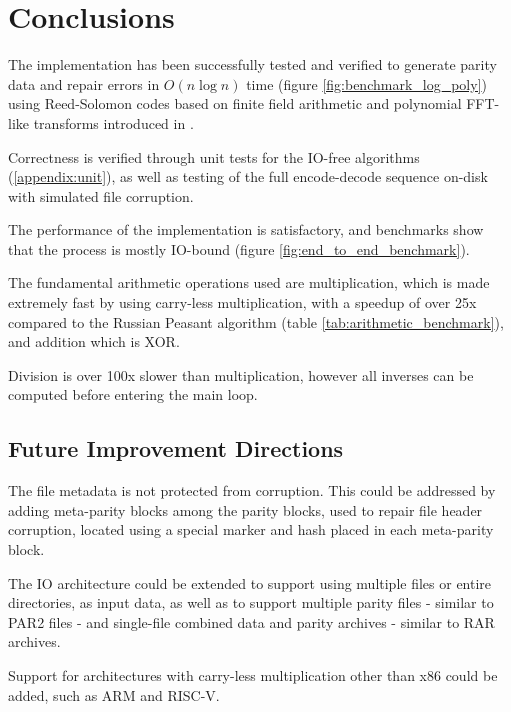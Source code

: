 \vspace{-3.5em}
\chapter{Conclusions}
\vspace{-1.5em}
The implementation has been successfully tested and verified to generate parity data and repair errors in $O(n \log n)$ time (figure \ref{fig:benchmark_log_poly})
using Reed-Solomon codes based on finite field arithmetic and polynomial FFT-like transforms introduced in \cite{novel-poly}.

Correctness is verified through unit tests for the IO-free algorithms (\ref{appendix:unit}), as well as testing of the full encode-decode sequence on-disk with simulated file corruption.

The performance of the implementation is satisfactory, and benchmarks show that the process is mostly IO-bound (figure \ref{fig:end_to_end_benchmark}).

The fundamental arithmetic operations used are  multiplication, which is made extremely fast by using carry-less multiplication,
with a speedup of over 25x compared to the Russian Peasant algorithm (table \ref{tab:arithmetic_benchmark}), and  addition which is XOR.

Division is over 100x slower than multiplication, however all inverses can be computed before entering the main loop.

\vspace{-1.5em}
\section{Future Improvement Directions}
\vspace{-0.5em}

The file metadata is not protected from corruption. This could be addressed by adding meta-parity blocks among the parity blocks, used to repair file header corruption, located using a special marker and hash placed in each meta-parity block.

The IO architecture could be extended to support using multiple files or entire directories, as input data, as well as to support multiple parity files - similar to PAR2 files - and single-file combined data and parity archives - similar to RAR archives.

Support for architectures with carry-less multiplication other than x86 could be added, such as ARM and RISC-V.
\enlargethispage{\baselineskip}
